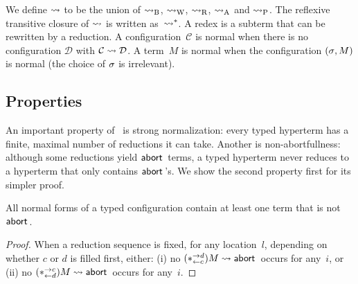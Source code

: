 {\begin{definition}
\end{definition}

We define $\rightsquigarrow$ to be the union of $\rightsquigarrow_{\mathrm B}$, $\rightsquigarrow_{\mathrm W}$, $\rightsquigarrow_{\mathrm R}$,
$\rightsquigarrow_{\mathrm A}$ and $\rightsquigarrow_{\mathrm P}$.
The reflexive transitive closure of $\rightsquigarrow$ is
written as~$\rightsquigarrow^\ast$.
A redex is a subterm that can be rewritten by a reduction.
A configuration~$\mathcal{C}$ is normal when there is no configuration
$\mathcal{D}$ with $\mathcal{C}\rightsquigarrow \mathcal{D}$.
A term~$M$ is normal when the configuration $({\sigma}{},{M})$ is
normal (the choice of ${\sigma}$ is irrelevant).


\subsection{Properties}

An important property of
\lgd\, is strong normalization:
every typed hyperterm has a finite, maximal number of reductions it can
take.
Another is {non-abortfullness}: although some reductions yield
$\mathsf{abort\,}$ terms, a typed hyperterm never reduces to a hyperterm that only
contains $\mathsf{abort\,}$'s.  We show the second property first for its simpler proof.

\begin{theorem}
 \label{nab}
 All normal forms of a typed configuration contain at least one term
 that is not $\mathsf{abort\,}$.
\end{theorem}
\begin{proof}
 When a reduction sequence is fixed, for any location~$l$, depending on
 whether $c$ or $d$ is filled first,
 either:
 (i)  no ${(\ast^{\rightarrow {d}}_{\leftarrow{c}})M} \rightsquigarrow {\mathsf{abort\,}}$ occurs for any~$i$, or
 (ii) no ${(\ast^{\rightarrow {c}}_{\leftarrow{d}})M} \rightsquigarrow {\mathsf{abort\,}}$ occurs for any~$i$.


\end{proof}}
